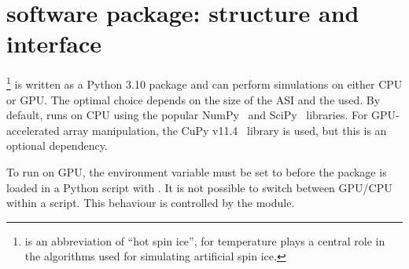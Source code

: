 \chapter{\hotspice software package: structure and interface}\label{app:API}

\hotspice\footnote{
	\hotspice is an abbreviation of ``hot spin ice'', for temperature plays a central role in the  algorithms used for simulating artificial spin ice.
} is written as a Python 3.10 package and can perform simulations on either CPU or GPU.
The optimal  choice depends on the size of the ASI and the  used.
By default, \hotspice runs on CPU using the popular NumPy~\cite{NumPy} and SciPy~\cite{SciPy} libraries.
For GPU-accelerated array manipulation, the CuPy v11.4~\cite{CuPy} library is used, but this is an optional dependency. \par
To run on GPU, the environment variable  must be set to  before the \hotspice package is loaded in a Python script with .
It is not possible to switch between GPU/CPU within a script.
This behaviour is controlled by the \textbf{} module.


